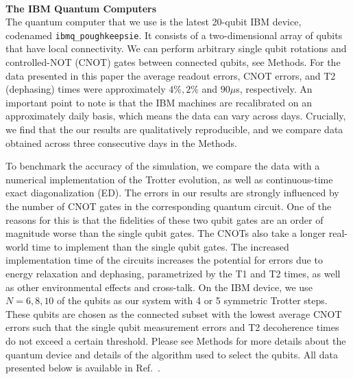 \documentclass[twocolumn,showpacs,preprintnumbers,nofootinbib,amsmath,aps,pra,longbibliography,amssymb,superscriptaddress]{revtex4-1}
\begin{document}
\hfill\\\textbf{The IBM Quantum Computers}\\
The quantum computer that we use is the latest 20-qubit IBM device, codenamed \texttt{ibmq\_poughkeepsie}. It consists of a two-dimensional array of qubits that have local connectivity. We can perform arbitrary single qubit rotations and controlled-NOT (CNOT) gates between connected qubits, see Methods. For the data presented in this paper the average readout errors, CNOT errors, and T2 (dephasing) times were approximately $4\%, 2\%$ and $90\mu$s, respectively. An important point to note is that the IBM machines are recalibrated on an approximately daily basis, which means the data can vary across days. Crucially, we find that the our results are qualitatively reproducible, and we compare data obtained across three consecutive days in the Methods. 

To benchmark the accuracy of the simulation, we compare the data with a numerical implementation of the Trotter evolution, as well as continuous-time exact diagonalization (ED). The errors in our results are strongly influenced by the number of CNOT gates in the corresponding quantum circuit. One of the reasons for this is that the fidelities of these two qubit gates are an order of magnitude worse than the single qubit gates. The CNOTs also take a longer real-world time to implement than the single qubit gates. The increased implementation time of the circuits increases the potential for errors due to energy relaxation and dephasing, parametrized by the T1 and T2 times, as well as other environmental effects and cross-talk. On the IBM device, we use $N=6,8,10$ of the qubits as our system with 4 or 5 symmetric Trotter steps. These qubits are chosen as the connected subset with the lowest average CNOT errors such that the single qubit measurement errors and T2 decoherence times do not exceed a certain threshold. Please see Methods for more details about the quantum device and details of the algorithm used to select the qubits. All data presented below is available in Ref.~\cite{IBMdata}.
\end{document}
